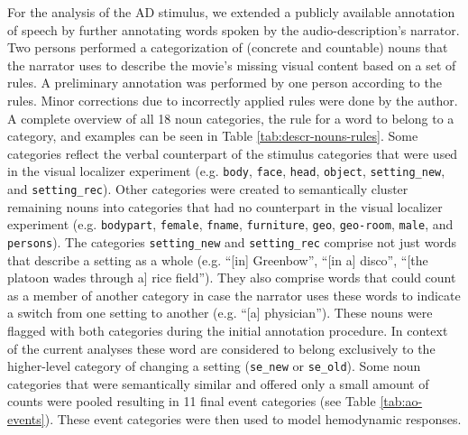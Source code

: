 \documentclass[english]{article}
\begin{document}
For the analysis of the AD stimulus, we extended a publicly available annotation
of speech \citep{hausler2021studyforrest} by further annotating words spoken by
the audio-description's narrator.
Two persons performed a categorization of (concrete and countable) nouns that
the narrator uses to describe the movie's missing visual content based on a set
of rules.
A preliminary annotation was performed by one person according to the rules.
Minor corrections due to incorrectly applied rules were done by the author.
A complete overview of all 18 noun categories, the rule for a word to belong to
a category, and examples can be seen in Table \ref{tab:descr-nouns-rules}.
Some categories reflect the verbal counterpart of the stimulus categories that
were used in the visual localizer experiment (e.g. \texttt{body}, \texttt{face},
\texttt{head}, \texttt{object}, \texttt{setting\_new}, and
\texttt{setting\_rec}).
Other categories were created to semantically cluster remaining nouns into
categories that had no counterpart in the visual localizer experiment (e.g.
\texttt{bodypart}, \texttt{female}, \texttt{fname}, \texttt{furniture},
\texttt{geo}, \texttt{geo-room}, \texttt{male}, and \texttt{persons}).
The categories \texttt{setting\_new} and \texttt{setting\_rec} comprise not just
words that describe a setting as a whole (e.g. ``[in] Greenbow'', ``[in a]
disco'', ``[the platoon wades through a] rice field''). They also comprise words
that could count as a member of another category in case the narrator uses
these words to indicate a switch from one setting to another (e.g. ``[a]
physician'').
These nouns were flagged with both categories during the initial annotation
procedure. In context of the current analyses these word are considered to
belong exclusively to the higher-level category of changing a setting
(\texttt{se\_new} or \texttt{se\_old}).
Some noun categories that were semantically similar and offered only a small
amount of counts were pooled resulting in 11 final event categories (see Table
\ref{tab:ao-events}). These event categories were then used to model hemodynamic
responses.
\end{document}
